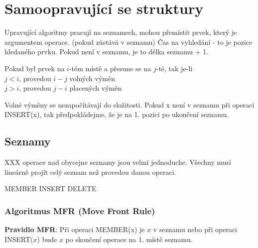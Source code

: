 



\chapter{Samoopravující se struktury}

Upravující algoritmy pracují na seznamech, mohou přemístit prvek, 
který je argumentem operace. (pokud zůstává v seznamu) 
Čas na vyhledání - to je pozice hledaného prvku. Pokud není v seznamu, je
to délka seznamu + 1.
\par

Pokud byl prvek na $i$-tém místě a přesune se na $j$-té, tak je-li\\
  $j < i$, provedou $i-j$ volných výměn\\
  $j > i$, provedou $j-i$ placených výměn
\par

Volné výměny se nezapočítávají do složitosti.
Pokud x není v seznamu při operaci INSERT(x), tak předpokládejme, že je na
1. pozici po ukončení seznamu.


\section{Seznamy}

{\mnote XXX operace nad obycejne seznamy jsou velmi jednoduche. Všechny
musí lineárně projít celý seznam než provedou danou operaci.}

MEMBER
INSERT
DELETE



\subsection{Algoritmus MFR (Move Front Rule)}

{\bf Pravidlo MFR}: Při operaci MEMBER(x) je $x$ v seznamu nebo při 
operaci INSERT($x$) bude $x$ po skončení operace na 1. místě seznamu.

